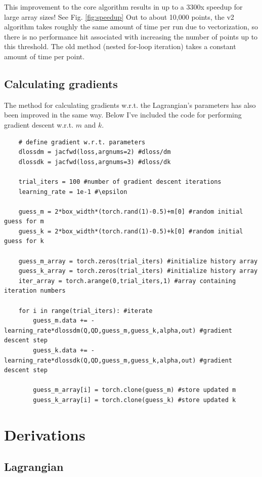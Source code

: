 \documentclass[]{article}
\begin{document}
This improvement to the core algorithm results in up to a 3300x speedup for large array sizes! See Fig. \ref{fig:speedup}  Out to about 10,000 points, the v2 algorithm takes roughly the same amount of time per run due to vectorization, so there is no performance hit associated with increasing the number of points up to this threshold. The old method (nested for-loop iteration) takes a constant amount of time per point.

\subsection{Calculating gradients}
The method for calculating gradients w.r.t. the Lagrangian's parameters has also been improved in the same way. Below I've included the code for performing gradient descent w.r.t. $m$ and $k$.

\begin{lstlisting}
	# define gradient w.r.t. parameters
	dlossdm = jacfwd(loss,argnums=2) #dloss/dm
	dlossdk = jacfwd(loss,argnums=3) #dloss/dk
	
	trial_iters = 100 #number of gradient descent iterations
	learning_rate = 1e-1 #\epsilon
	
	guess_m = 2*box_width*(torch.rand(1)-0.5)+m[0] #random initial guess for m
	guess_k = 2*box_width*(torch.rand(1)-0.5)+k[0] #random initial guess for k
	
	guess_m_array = torch.zeros(trial_iters) #initialize history array
	guess_k_array = torch.zeros(trial_iters) #initialize history array
	iter_array = torch.arange(0,trial_iters,1) #array containing iteration numbers
	
	for i in range(trial_iters): #iterate
		guess_m.data += -learning_rate*dlossdm(Q,QD,guess_m,guess_k,alpha,out) #gradient descent step
		guess_k.data += -learning_rate*dlossdk(Q,QD,guess_m,guess_k,alpha,out) #gradient descent step
	 
		guess_m_array[i] = torch.clone(guess_m) #store updated m
		guess_k_array[i] = torch.clone(guess_k) #store updated k
\end{lstlisting}


\section{Derivations}
\subsection{Lagrangian}
\end{document}
